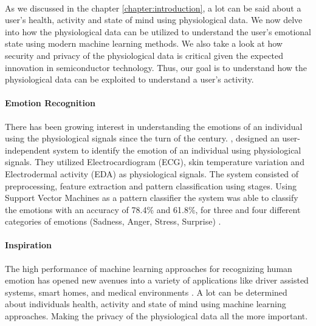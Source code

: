 \label{chapter:motivation}
\paragraph{}
As we discussed in the chapter \ref{chapter:introduction}, a lot can be said about a user's health, activity and state of mind using physiological data. We now delve into how the physiological data can be utilized to understand the user's emotional state using modern machine learning methods. We also take a look at how security and privacy of the physiological data is critical given the expected innovation in semiconductor technology. Thus, our goal is to understand how the physiological data can be exploited to understand a user's activity.

\paragraph{Emotion Recognition} There has been growing interest in understanding the emotions of an individual using the physiological signals since the turn of the century. \citeauthor{kim_emotion_2004}, designed an user-independent system to identify the emotion of an individual using physiological signals. They utilized Electrocardiogram (ECG), skin temperature variation and Electrodermal activity (EDA) as physiological signals. The system consisted of preprocessing, feature extraction and pattern classification using stages. Using Support Vector Machines as a pattern classifier the system was able to classify the emotions with an accuracy of 78.4\% and 61.8\%, for three and four different categories of emotions (Sadness, Anger, Stress, Surprise) \cite{kim_emotion_2004}.

\paragraph{Inspiration} The high performance of machine learning approaches for recognizing human emotion has opened new avenues into a variety of applications like driver assisted systems, smart homes, and medical environments \cite{ali_globally_2018}. A lot can be determined about individuals health, activity and state of mind using machine learning approaches. Making the privacy of the physiological data all the more important.

